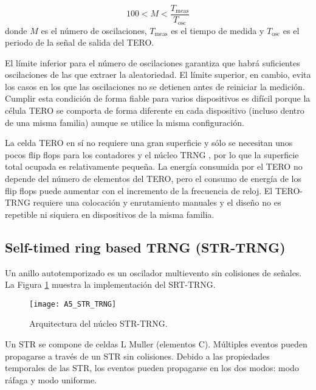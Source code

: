             \begin{equation}
                100 < M < \frac{T_{\text{meas}}}{T_{\text{osc}}} 
                \label{eq:limites_tero}
            \end{equation}
            donde $M$ es el número de oscilaciones, $T_{\text{meas}}$ es el tiempo de medida y $T_{\text{osc}}$ es el periodo de la señal de salida del TERO.

            El límite inferior para el número de oscilaciones garantiza que habrá suficientes oscilaciones de las que extraer la aleatoriedad. El límite superior, en cambio, evita los casos en los que las oscilaciones no se detienen antes de reiniciar la medición. Cumplir esta condición de forma fiable para varios dispositivos es difícil porque la célula TERO se comporta de forma diferente en cada dispositivo (incluso dentro de una misma familia) aunque se utilice la misma configuración.

                La celda TERO en sí no requiere una gran superficie y sólo se necesitan unos pocos flip flops para los contadores y el núcleo TRNG \cite{Bernard2018}, por lo que la superficie total ocupada es relativamente pequeña. La energía consumida por el TERO no depende del número de elementos del TERO, pero el consumo de energía de los flip flops puede aumentar con el incremento de la frecuencia de reloj. El TERO-TRNG requiere una colocación y enrutamiento manuales y el diseño no es repetible ni siquiera en dispositivos de la misma familia.
				
		\subsection{Self-timed ring based TRNG (STR-TRNG)}

                Un anillo autotemporizado es un oscilador multievento sin colisiones de señales. La Figura \ref{fig:A5_STR_TRNG} muestra la implementación del SRT-TRNG.
	
				\begin{figure}[hbtp]
					\centering
					\texttt{[image: A5\_STR\_TRNG]}
					\caption{Arquitectura del núcleo STR-TRNG.}
					\label{fig:A5_STR_TRNG}
				\end{figure}

                Un STR se compone de celdas L Muller (elementos C). Múltiples eventos pueden propagarse a través de un STR sin colisiones. Debido a las propiedades temporales de las STR, los eventos pueden propagarse en los dos modos: modo ráfaga y modo uniforme.


